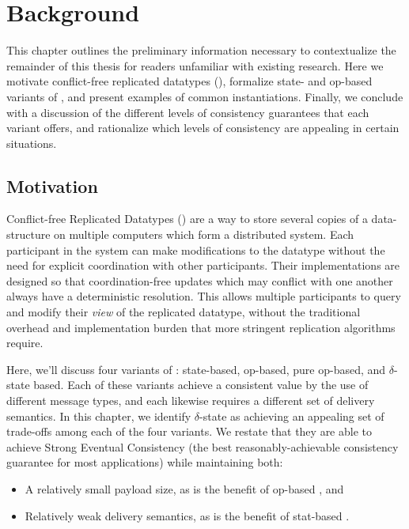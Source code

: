 \chapter{Background}
\label{chap:background}

This chapter outlines the preliminary information necessary to contextualize the
remainder of this thesis for readers unfamiliar with existing \CRDT research.
Here we motivate conflict-free replicated datatypes (\CRDTs), formalize state-
and op-based variants of \CRDTs, and present examples of common instantiations.
Finally, we conclude with a discussion of the different levels of consistency
guarantees that each \CRDT variant offers, and rationalize which levels of
consistency are appealing in certain situations.

\section{Motivation}
Conflict-free Replicated Datatypes (\CRDTs) are a way to store several copies of
a data-structure on multiple computers which form a distributed system. Each
participant in the system can make modifications to the datatype without
the need for explicit coordination with other participants. Their
implementations are designed so that coordination-free updates which may
conflict with one another always have a deterministic resolution. This allows
multiple participants to query and modify their \emph{view} of the replicated
datatype, without the traditional overhead and implementation burden that more
stringent replication algorithms require.

Here, we'll discuss four variants of \CRDTs: state-based, op-based, pure
op-based, and $\delta$-state based. Each of these variants achieve a consistent
value by the use of different message types, and each likewise requires a
different set of delivery semantics. In this chapter, we identify $\delta$-state
\CRDTs as achieving an appealing set of trade-offs among each of the four
variants. We restate that they are able to achieve Strong Eventual Consistency
(the best reasonably-achievable consistency guarantee for most \CRDT
applications) while maintaining both:
\begin{itemize}
  \item A relatively small payload size, as is the benefit of op-based \CRDTs,
    and
  \item Relatively weak delivery semantics, as is the benefit of stat-based
    \CRDTs.
\end{itemize}

